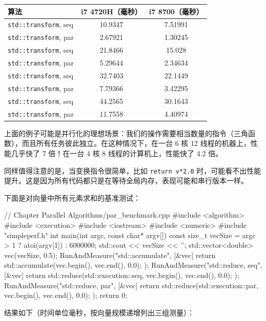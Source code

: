 \begin{table}[H]
\centering
\begin{tabularx}{\textwidth}{X c c}
\toprule
算法 & i7 4720H（毫秒） & i7 8700（毫秒） \\
\midrule
\texttt{std::transform}, seq & 10.9347 & 7.51991 \\
\texttt{std::transform}, par & 2.67921 & 1.30245 \\
\texttt{std::transform}, seq & 21.8466 & 15.028 \\
\texttt{std::transform}, par & 5.29644 & 2.34634 \\
\texttt{std::transform}, seq & 32.7403 & 22.1449 \\
\texttt{std::transform}, par & 7.79366 & 3.42295 \\
\texttt{std::transform}, seq & 44.2565 & 30.1643 \\
\texttt{std::transform}, par & 11.7558 & 4.40974 \\
\bottomrule
\end{tabularx}
\end{table}


上面的例子可能是并行化的理想场景：我们的操作需要相当数量的指令（三角函数），而且所有任务彼此独立。在这种情况下，在一台 6 核 12 线程的机器上，性能几乎快了 7 倍！在一台 4 核 8 线程的计算机上，性能快了 4.2 倍。

同样值得注意的是，当变换指令很简单，比如 \texttt{return v*2.0} 时，可能看不出性能提升。这是因为所有代码都只是在等待全局内存，表现可能和串行版本一样。

下面是对向量中所有元素求和的基准测试：

\begin{codebox}[cpp]
// Chapter Parallel Algorithms/par_benchmark.cpp
#include <algorithm>
#include <execution>
#include <iostream>
#include <numeric>
#include "simpleperf.h"
int main(int argc, const char* argv[])
{
const size_t vecSize = argc > 1 ? atoi(argv[1]) : 6000000;
std::cout << vecSize << '\n';
std::vector<double> vec(vecSize, 0.5);
RunAndMeasure("std::accumulate", [&vec] {
return std::accumulate(vec.begin(), vec.end(), 0.0);
});
RunAndMeasure("std::reduce, seq", [&vec] {
return std::reduce(std::execution::seq,
vec.begin(), vec.end(), 0.0);
}
);
RunAndMeasure("std::reduce, par", [&vec] {
return std::reduce(std::execution::par,
vec.begin(), vec.end(), 0.0);
}
);
return 0;
}
\end{codebox}

结果如下（时间单位毫秒，按向量规模递增列出三组测量）：

